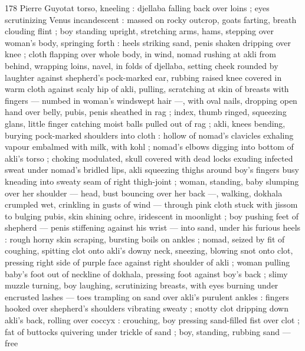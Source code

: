 178 Pierre Guyotat
torso, kneeling : djellaba falling back over loins ; eyes scrutinizing
Venus incandescent : massed on rocky outcrop, goats farting, breath
clouding flint ; boy standing upright, stretching arms, hams, stepping
over woman's body, springing forth : heels striking sand, penis
shaken dripping over knee ; cloth flapping over whole body, in wind,
nomad rushing at akli from behind, wrapping loins, navel, in folds of
djellaba, setting cheek rounded by laughter against shepherd's
pock-marked ear, rubbing raised knee covered in warm cloth against
scaly hip of akli, pulling, scratching at skin of breasts with fingers —
numbed in woman's windswept hair —, with oval nails, dropping
open hand over belly, pubis, penis sheathed in rag ; index, thumb
ringed, squeezing glans, little finger catching moist balls pulled out
of rag ; akli, knees bending, burying pock-marked shoulders into
cloth : hollow of nomad’s clavicles exhaling vapour embalmed with
milk, with kohl ; nomad’s elbows digging into bottom of akli’s torso
; choking modulated, skull covered with dead locks exuding infected
sweat under nomad's bridled lips, akli squeezing thighs around boy's
fingers busy kneading into sweaty seam of right thigh-joint ; woman,
standing, baby slumping over her shoulder — head, bust bouncing
over her back —, walking, dokhala crumpled wet, crinkling in gusts
of wind — through pink cloth stuck with jissom to bulging pubis, skin
shining ochre, iridescent in moonlight ; boy pushing feet of shepherd
— penis stiffening against his wrist — into sand, under his furious
heels : rough horny skin scraping, bursting boils on ankles ; nomad,
seized by fit of coughing, spitting clot onto akli’s downy neck,
sneezing, blowing snot onto clot, pressing right side of purple face
against right shoulder of akli ; woman pulling baby's foot out of
neckline of dokhala, pressing foot against boy's back ; slimy muzzle
turning, boy laughing, scrutinizing breasts, with eyes burning under
encrusted lashes — toes trampling on sand over akli’s purulent
ankles : fingers hooked over shepherd’s shoulders vibrating sweaty
; snotty clot dripping down akli’s back, rolling over coccyx :
crouching, boy pressing sand-filled fist over clot ; fat of buttocks
quivering under trickle of sand ; boy, standing, rubbing sand — free


